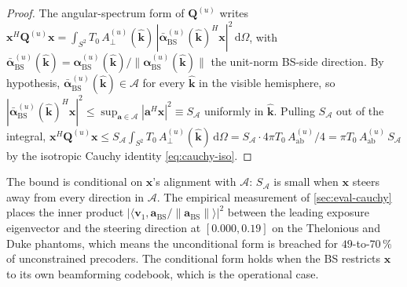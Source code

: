 \documentclass[journal,twocolumn,10pt]{IEEEtran}
\theoremstyle{plain}
\theoremstyle{remark}
\newcommand{\khat}{\hat{\bm{k}}}
\newcommand{\xx}{\mathbf{x}}
\newcommand{\Aab}{A_{\mathrm{ab}}}
\newcommand{\Qmat}{\mathbf{Q}}
\newcommand{\diff}{\mathrm{d}}
\begin{document}
\begin{proof}
The angular-spectrum form of $\Qmat^{(u)}$ writes
$\xx^H \Qmat^{(u)} \xx = \int_{S^2} T_0\,A_\perp^{(u)}(\khat)\,
|\bar{\bm\alpha}_{\mathrm{BS}}^{(u)}(\khat)^H \xx|^2\,\diff\Omega$,
with $\bar{\bm\alpha}_{\mathrm{BS}}^{(u)}(\khat) =
\bm\alpha_{\mathrm{BS}}^{(u)}(\khat)/
\|\bm\alpha_{\mathrm{BS}}^{(u)}(\khat)\|$ the unit-norm BS-side
direction. By hypothesis, $\bar{\bm\alpha}_{\mathrm{BS}}^{(u)}(\khat)
\in \mathcal{A}$ for every $\khat$ in the visible hemisphere, so
$|\bar{\bm\alpha}_{\mathrm{BS}}^{(u)}(\khat)^H \xx|^2 \leq
\sup_{\mathbf{a} \in \mathcal{A}} |\mathbf{a}^H \xx|^2 \equiv
S_{\mathcal{A}}$ uniformly in $\khat$. Pulling $S_{\mathcal{A}}$
out of the integral,
$\xx^H \Qmat^{(u)} \xx \leq S_{\mathcal{A}} \int_{S^2} T_0\,
A_\perp^{(u)}(\khat)\,\diff\Omega = S_{\mathcal{A}} \cdot 4\pi T_0
\,\Aab^{(u)}/4 = \pi T_0\,\Aab^{(u)}\,S_{\mathcal{A}}$ by the
isotropic Cauchy identity \cref{eq:cauchy-iso}.
\end{proof}

The bound is conditional on $\xx$'s alignment with $\mathcal{A}$:
$S_{\mathcal{A}}$ is small when $\xx$ steers away from every
direction in $\mathcal{A}$. The empirical measurement of
\cref{sec:eval-cauchy} places the inner product
$|\langle \mathbf{v}_1, \mathbf{a}_{\mathrm{BS}}/
\|\mathbf{a}_{\mathrm{BS}}\| \rangle|^2$ between the leading
exposure eigenvector and the steering direction at $[0.000, 0.19]$
on the Thelonious and Duke phantoms, which means the unconditional
form is breached for $49$-to-$70\,\%$ of unconstrained precoders.
The conditional form holds when the BS restricts $\xx$ to its
own beamforming codebook, which is the operational case.




\end{document}
